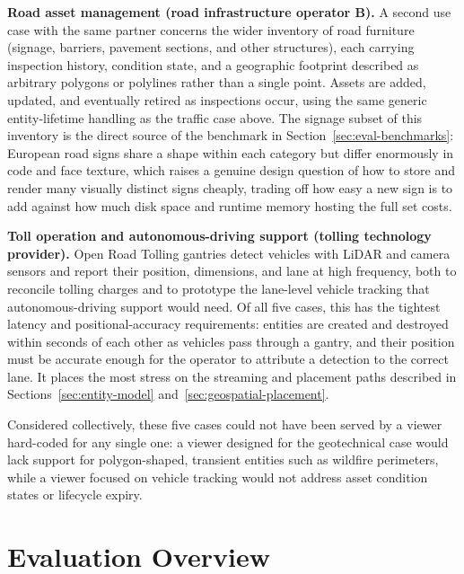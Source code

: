 \textbf{Road asset management (road infrastructure operator B).} A second use case with the same partner concerns the wider inventory of road furniture (signage, barriers, pavement sections, and other structures), each carrying inspection history, condition state, and a geographic footprint described as arbitrary polygons or polylines rather than a single point. Assets are added, updated, and eventually retired as inspections occur, using the same generic entity-lifetime handling as the traffic case above. The signage subset of this inventory is the direct source of the benchmark in Section~\ref{sec:eval-benchmarks}: European road signs share a shape within each category but differ enormously in code and face texture, which raises a genuine design question of how to store and render many visually distinct signs cheaply, trading off how easy a new sign is to add against how much disk space and runtime memory hosting the full set costs.

\textbf{Toll operation and autonomous-driving support (tolling technology provider).} Open Road Tolling gantries detect vehicles with LiDAR and camera sensors and report their position, dimensions, and lane at high frequency, both to reconcile tolling charges and to prototype the lane-level vehicle tracking that autonomous-driving support would need. Of all five cases, this has the tightest latency and positional-accuracy requirements: entities are created and destroyed within seconds of each other as vehicles pass through a gantry, and their position must be accurate enough for the operator to attribute a detection to the correct lane. It places the most stress on the streaming and placement paths described in Sections~\ref{sec:entity-model} and~\ref{sec:geospatial-placement}.

Considered collectively, these five cases could not have been served by a viewer hard-coded for any single one: a viewer designed for the geotechnical case would lack support for polygon-shaped, transient entities such as wildfire perimeters, while a viewer focused on vehicle tracking would not address asset condition states or lifecycle expiry.

\section{Evaluation Overview}
\label{sec:eval-overview}

